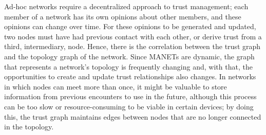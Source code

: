 
Ad-hoc networks require a decentralized approach to trust management; each member of a network has its own opinions about other members, and these opinions can change over time.
For these opinions to be generated and updated, two nodes must have had previous contact with each other, or derive trust from a third, intermediary, node.
Hence, there is the correlation between the trust graph and the topology graph of the network.
Since MANETs are dynamic, the graph that represents a network's topology is frequently changing and, with that, the opportunities to create and update trust relationships also changes.
In networks in which nodes can meet more than once, it might be valuable to store information from previous encounters to use in the future, although this process can be too slow or resource-consuming to be viable in certain devices; by doing this, the trust graph maintains edges between nodes that are no longer connected in the topology.













